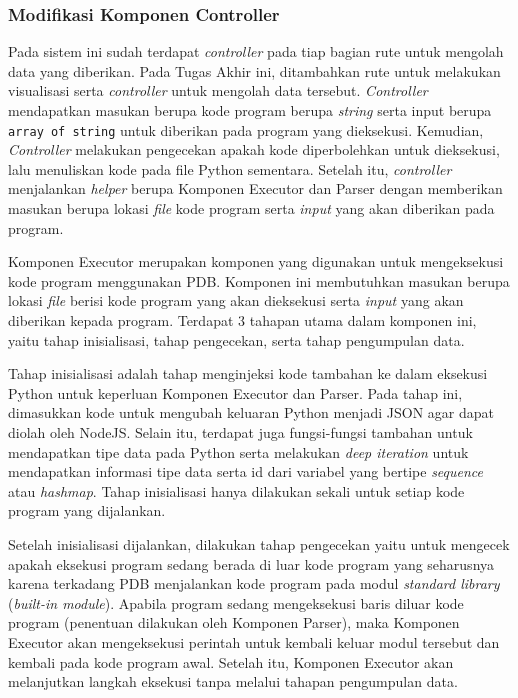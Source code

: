 \subsubsection{Modifikasi Komponen Controller}
Pada sistem ini sudah terdapat \textit{controller} pada tiap bagian rute untuk mengolah data yang diberikan. Pada Tugas Akhir ini, ditambahkan rute untuk melakukan visualisasi serta \textit{controller} untuk mengolah data tersebut. \textit{Controller} mendapatkan masukan berupa kode program berupa \textit{string} serta input berupa \verb|array of string| untuk diberikan pada program yang dieksekusi. Kemudian, \textit{Controller} melakukan pengecekan apakah kode diperbolehkan untuk dieksekusi, lalu menuliskan kode pada file Python sementara. Setelah itu, \textit{controller} menjalankan \textit{helper} berupa Komponen Executor dan Parser dengan memberikan masukan berupa lokasi \textit{file} kode program serta \textit{input} yang akan diberikan pada program.


Komponen Executor merupakan komponen yang digunakan untuk mengeksekusi kode program menggunakan PDB. Komponen ini membutuhkan masukan berupa lokasi \textit{file} berisi kode program yang akan dieksekusi serta \textit{input} yang akan diberikan kepada program. Terdapat 3 tahapan utama dalam komponen ini, yaitu tahap inisialisasi, tahap pengecekan, serta tahap pengumpulan data.

Tahap inisialisasi adalah tahap menginjeksi kode tambahan ke dalam eksekusi Python untuk keperluan Komponen Executor dan Parser. Pada tahap ini, dimasukkan kode untuk mengubah keluaran Python menjadi JSON agar dapat diolah oleh NodeJS. Selain itu, terdapat juga fungsi-fungsi tambahan untuk mendapatkan tipe data pada Python serta melakukan \textit{deep iteration} untuk mendapatkan informasi tipe data serta id dari variabel yang bertipe \textit{sequence} atau \textit{hashmap}. Tahap inisialisasi hanya dilakukan sekali untuk setiap kode program yang dijalankan.

Setelah inisialisasi dijalankan, dilakukan tahap pengecekan yaitu untuk mengecek apakah eksekusi program sedang berada di luar kode program yang seharusnya karena terkadang PDB menjalankan kode program pada modul \textit{standard library} (\textit{built-in module}). Apabila program sedang mengeksekusi baris diluar kode program (penentuan dilakukan oleh Komponen Parser), maka Komponen Executor akan mengeksekusi perintah untuk kembali keluar modul tersebut dan kembali pada kode program awal. Setelah itu, Komponen Executor akan melanjutkan langkah eksekusi tanpa melalui tahapan pengumpulan data.

